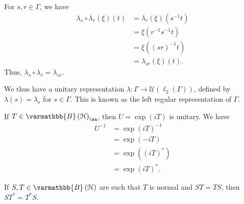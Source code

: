 \documentclass[10pt]{mypackage}
\renewcommand*{\mathbb}[1]{\varmathbb{#1}}
\newcommand{\B}{\mathbb{B}}
\begin{document}
\begin{example}
  For $s,r\in \Gamma$, we have
  \begin{align*}
    \lambda_s\circ \lambda_r\left(\xi\right)\left(t\right) &= \lambda_r\left(\xi\right)\left(s^{-1}t\right)\\
                                                           &= \xi\left(r^{-1}s^{-1}t\right)\\
                                                           &= \xi\left(\left(sr\right)^{-1}t\right)\\
                                                           &= \lambda_{sr}\left(\xi\right)\left(t\right).
  \end{align*}
  Thus, $\lambda_s\circ \lambda_r = \lambda_{sr}$.\newline

  We thus have a unitary representation $\lambda: \Gamma\rightarrow \mathcal{U}\left(\ell_2\left(\Gamma\right)\right)$, defined by $\lambda(s) = \lambda_s$ for $s\in \Gamma$. This is known as the left regular representation of $\Gamma$.
\end{example}
\begin{example}
  If $T\in \B\left(\mathcal{H}\right)_{\sa}$, then $U = \exp(iT)$ is unitary. We have
  \begin{align*}
    U^{-1} &= \exp\left(iT\right)^{-1}\\
           &= \exp\left(-iT\right)\\
           &= \exp\left(\left(iT\right)^{\ast}\right)\\
           &= \exp\left(iT\right)^{\ast}.
  \end{align*}
\end{example}
\begin{theorem}
  If $S,T\in \B\left(\mathcal{H}\right)$ are such that $T$ is normal and $ST = TS$, then $ST^{\ast} = T^{\ast}S$.
\end{theorem}
\end{document}
